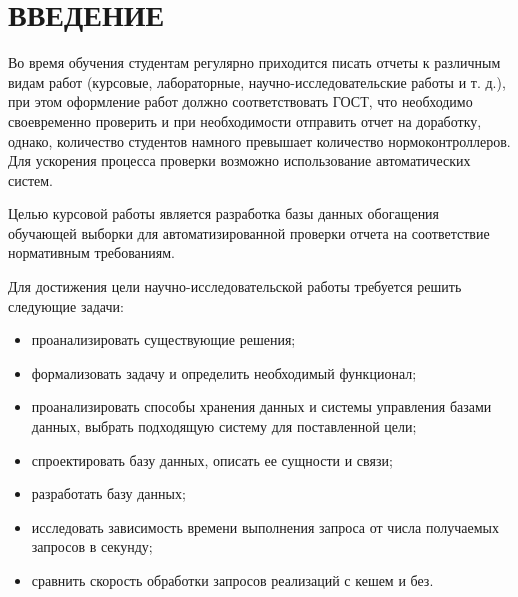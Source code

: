 \chapter*{ВВЕДЕНИЕ}

Во время обучения студентам регулярно приходится писать отчеты к различным видам работ (курсовые, лабораторные, научно-исследовательские работы и т. д.), при этом оформление работ должно соответствовать ГОСТ, что необходимо своевременно проверить и при необходимости отправить отчет на доработку, однако, количество студентов намного превышает количество нормоконтроллеров. Для ускорения процесса проверки возможно использование автоматических систем.

Целью курсовой работы является разработка базы данных обогащения обучающей выборки для автоматизированной проверки отчета на соответствие нормативным требованиям.

Для достижения цели научно-исследовательской работы требуется решить следующие задачи:
\begin{itemize}
	\item проанализировать существующие решения;
	\item формализовать задачу и определить необходимый функционал;
	\item проанализировать способы хранения данных и системы управления базами данных, выбрать подходящую систему для поставленной цели;
	\item спроектировать базу данных, описать ее сущности и связи;
	\item разработать базу данных;
	\item исследовать зависимость времени выполнения запроса от числа получаемых запросов в секунду;
	\item сравнить скорость обработки запросов реализаций с кешем и без.
\end{itemize}